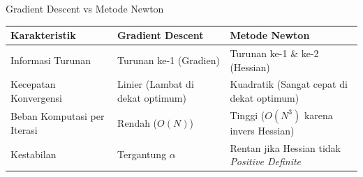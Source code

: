 \documentclass[aspectratio=169]{beamer}
\begin{document}
\begin{frame}{Gradient Descent vs Metode Newton}
    \begin{table}[]
    \begin{tabular}{@{}p{3.5cm}p{4cm}p{4cm}@{}}
    \toprule
    \textbf{Karakteristik} & \textbf{Gradient Descent} & \textbf{Metode Newton} \\ \midrule
    Informasi Turunan & Turunan ke-1 (Gradien) & Turunan ke-1 \& ke-2 (Hessian) \\ 
    Kecepatan Konvergensi & Linier (Lambat di dekat optimum) & Kuadratik (Sangat cepat di dekat optimum) \\ 
    Beban Komputasi per Iterasi & Rendah ($O(N)$) & Tinggi ($O(N^3)$ karena invers Hessian) \\ 
    Kestabilan & Tergantung $\alpha$ & Rentan jika Hessian tidak \textit{Positive Definite} \\ \bottomrule
    \end{tabular}
    \end{table}
\end{frame}
\end{document}
